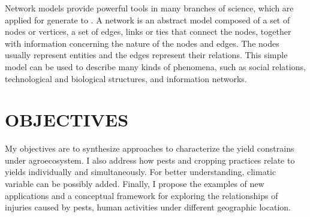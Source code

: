 Network models provide powerful tools in many branches of science, which are applied for generate to . A network is an abstract model composed of a set of nodes or vertices, a set of edges, links or ties that connect the nodes, together with information concerning the nature of the nodes and edges. The nodes usually represent entities and the edges represent their relations. This simple model can be used to describe many kinds of phenomena, such as social relations, technological and biological structures, and information networks.
\section*{OBJECTIVES}


My objectives are to synthesize approaches to characterize the yield constrains under agroecosystem. I also address how pests and cropping practices relate to yields individually and simultaneously. For better understanding, climatic variable can be possibly added. Finally, I propose the examples of new applications and a conceptual framework for exploring the relationships of injuries caused by pests, human activities under different geographic location.

